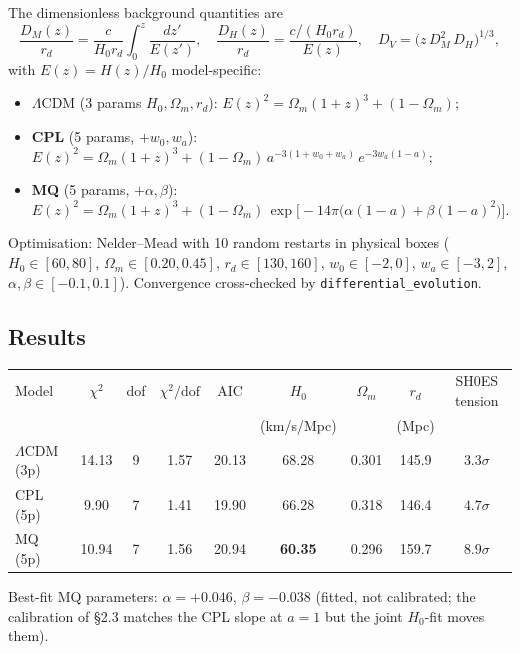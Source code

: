 \documentclass[11pt,letterpaper,twoside]{article}
\newcommand{\Lcdm}{\Lambda\mathrm{CDM}}
\newcommand{\Om}{\Omega_{m}}
\newcommand{\rd}{r_{d}}
\newcommand{\DM}{D_{M}}
\newcommand{\DH}{D_{H}}
\newcommand{\DV}{D_{V}}
\begin{document}
The dimensionless background quantities are
\begin{equation}
  \frac{\DM(z)}{\rd}=\frac{c}{H_{0}\rd}\!\int_{0}^{z}\!\!\frac{dz'}{E(z')},
  \quad
  \frac{\DH(z)}{\rd}=\frac{c/(H_{0}\rd)}{E(z)},
  \quad
  \DV=\bigl(z\,\DM^{2}\,\DH\bigr)^{1/3},
\end{equation}
with $E(z)=H(z)/H_{0}$ model-specific:
\begin{itemize}[leftmargin=*,topsep=0.1em,itemsep=0.1em]
\item \textbf{$\Lcdm$} (3 params $H_{0},\Om,\rd$):
      $E(z)^{2}=\Om(1+z)^{3}+(1-\Om)$;
\item \textbf{CPL} (5 params, $+w_{0},w_{a}$):
      $E(z)^{2}=\Om(1+z)^{3}+(1-\Om)\,a^{-3(1+w_{0}+w_{a})}\,e^{-3w_{a}(1-a)}$;
\item \textbf{MQ} (5 params, $+\alpha,\beta$):
      $E(z)^{2}=\Om(1+z)^{3}+(1-\Om)\,
       \exp\!\bigl[-14\pi\bigl(\alpha(1-a)+\beta(1-a)^{2}\bigr)\bigr]$.
\end{itemize}
Optimisation: Nelder--Mead with 10 random restarts in physical boxes
($H_{0}\in[60,80]$, $\Om\in[0.20,0.45]$, $\rd\in[130,160]$,
$w_{0}\in[-2,0]$, $w_{a}\in[-3,2]$, $\alpha,\beta\in[-0.1,0.1]$).
Convergence cross-checked by \texttt{differential\_evolution}.

\subsection{Results}\label{sec:results}

\begin{table}[h!]
\centering\small
\begin{tabular}{lcccccccc}
\toprule
Model & $\chi^{2}$ & dof & $\chi^{2}/\!\mathrm{dof}$ & AIC
      & $H_{0}$ & $\Om$ & $\rd$ & SH0ES tension \\
      &           &     &                            &
      & (km/s/Mpc) &      & (Mpc) &                 \\
\midrule
$\Lcdm$ (3p) & 14.13 & 9 & 1.57 & 20.13 & 68.28 & 0.301 & 145.9 & $3.3\sigma$ \\
CPL (5p)     &  9.90 & 7 & 1.41 & 19.90 & 66.28 & 0.318 & 146.4 & $4.7\sigma$ \\
MQ (5p)      & 10.94 & 7 & 1.56 & 20.94 & \textbf{60.35} & 0.296 & 159.7
             & \textbf{$8.9\sigma$} \\
\bottomrule
\end{tabular}
\end{table}

\noindent Best-fit MQ parameters: $\alpha=+0.046$, $\beta=-0.038$ (fitted, not
calibrated; the calibration of \S2.3 matches the CPL slope at $a=1$ but the
joint $H_{0}$-fit moves them).
\end{document}
